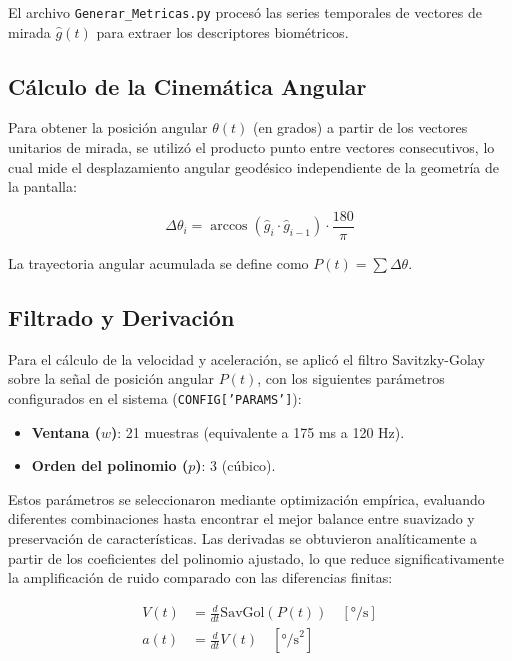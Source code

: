 El archivo \texttt{Generar\_Metricas.py} procesó las series temporales de vectores de mirada $\hat{g}(t)$ para extraer los descriptores biométricos.

\subsection{Cálculo de la Cinemática Angular}

Para obtener la posición angular $\theta(t)$ (en grados) a partir de los vectores unitarios de mirada, se utilizó el producto punto entre vectores consecutivos, lo cual mide el desplazamiento angular geodésico independiente de la geometría de la pantalla:

\begin{equation}
	\Delta \theta_i = \arccos(\hat{g}_i \cdot \hat{g}_{i-1}) \cdot \frac{180}{\pi}
\end{equation}

La trayectoria angular acumulada se define como $P(t) = \sum \Delta \theta$.

\subsection{Filtrado y Derivación}

Para el cálculo de la velocidad y aceleración, se aplicó el filtro Savitzky-Golay \cite{savitzky1964smoothing} sobre la señal de posición angular $P(t)$, con los siguientes parámetros configurados en el sistema (\texttt{CONFIG['PARAMS']}):

\begin{itemize}
	\item \textbf{Ventana ($w$)}: 21 muestras (equivalente a 175 ms a 120 Hz).
	\item \textbf{Orden del polinomio ($p$)}: 3 (cúbico).
\end{itemize}

Estos parámetros se seleccionaron mediante optimización empírica, evaluando diferentes combinaciones hasta encontrar el mejor balance entre suavizado y preservación de características.
Las derivadas se obtuvieron analíticamente a partir de los coeficientes del polinomio ajustado, lo que reduce significativamente la amplificación de ruido comparado con las diferencias finitas:

\begin{align}
	V(t) &= \frac{d}{dt} \text{SavGol}(P(t)) \quad [\text{°/s}] \\
	a(t) &= \frac{d}{dt} V(t) \quad [\text{°/s}^2]
\end{align}

